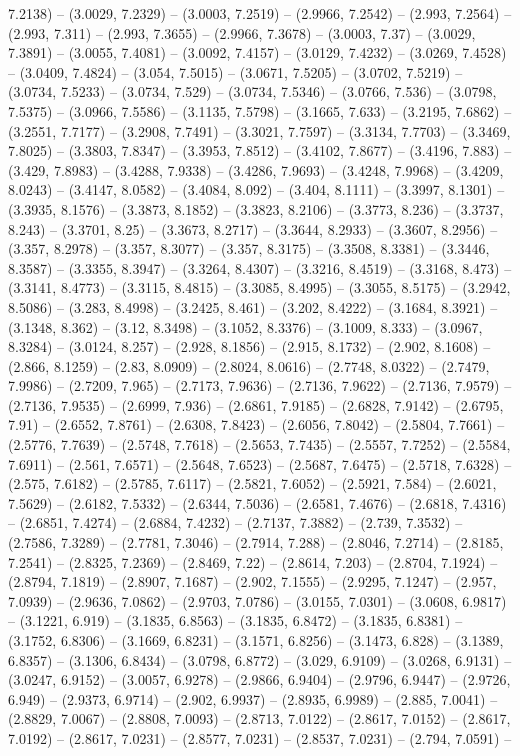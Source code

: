 7.2138) -- (3.0029, 7.2329) -- (3.0003, 7.2519) -- (2.9966, 7.2542) -- (2.993, 7.2564) -- (2.993, 7.311) -- (2.993, 7.3655) -- (2.9966, 7.3678) -- (3.0003, 7.37) -- (3.0029, 7.3891) -- (3.0055, 7.4081) -- (3.0092, 7.4157) -- (3.0129, 7.4232) -- (3.0269, 7.4528) -- (3.0409, 7.4824) -- (3.054, 7.5015) -- (3.0671, 7.5205) -- (3.0702, 7.5219) -- (3.0734, 7.5233) -- (3.0734, 7.529) -- (3.0734, 7.5346) -- (3.0766, 7.536) -- (3.0798, 7.5375) -- (3.0966, 7.5586) -- (3.1135, 7.5798) -- (3.1665, 7.633) -- (3.2195, 7.6862) -- (3.2551, 7.7177) -- (3.2908, 7.7491) -- (3.3021, 7.7597) -- (3.3134, 7.7703) -- (3.3469, 7.8025) -- (3.3803, 7.8347) -- (3.3953, 7.8512) -- (3.4102, 7.8677) -- (3.4196, 7.883) -- (3.429, 7.8983) -- (3.4288, 7.9338) -- (3.4286, 7.9693) -- (3.4248, 7.9968) -- (3.4209, 8.0243) -- (3.4147, 8.0582) -- (3.4084, 8.092) -- (3.404, 8.1111) -- (3.3997, 8.1301) -- (3.3935, 8.1576) -- (3.3873, 8.1852) -- (3.3823, 8.2106) -- (3.3773, 8.236) -- (3.3737, 8.243) -- (3.3701, 8.25) -- (3.3673, 8.2717) -- (3.3644, 8.2933) -- (3.3607, 8.2956) -- (3.357, 8.2978) -- (3.357, 8.3077) -- (3.357, 8.3175) -- (3.3508, 8.3381) -- (3.3446, 8.3587) -- (3.3355, 8.3947) -- (3.3264, 8.4307) -- (3.3216, 8.4519) -- (3.3168, 8.473) -- (3.3141, 8.4773) -- (3.3115, 8.4815) -- (3.3085, 8.4995) -- (3.3055, 8.5175) -- (3.2942, 8.5086) -- (3.283, 8.4998) -- (3.2425, 8.461) -- (3.202, 8.4222) -- (3.1684, 8.3921) -- (3.1348, 8.362) -- (3.12, 8.3498) -- (3.1052, 8.3376) -- (3.1009, 8.333) -- (3.0967, 8.3284) -- (3.0124, 8.257) -- (2.928, 8.1856) -- (2.915, 8.1732) -- (2.902, 8.1608) -- (2.866, 8.1259) -- (2.83, 8.0909) -- (2.8024, 8.0616) -- (2.7748, 8.0322) -- (2.7479, 7.9986) -- (2.7209, 7.965) -- (2.7173, 7.9636) -- (2.7136, 7.9622) -- (2.7136, 7.9579) -- (2.7136, 7.9535) -- (2.6999, 7.936) -- (2.6861, 7.9185) -- (2.6828, 7.9142) -- (2.6795, 7.91) -- (2.6552, 7.8761) -- (2.6308, 7.8423) -- (2.6056, 7.8042) -- (2.5804, 7.7661) -- (2.5776, 7.7639) -- (2.5748, 7.7618) -- (2.5653, 7.7435) -- (2.5557, 7.7252) -- (2.5584, 7.6911) -- (2.561, 7.6571) -- (2.5648, 7.6523) -- (2.5687, 7.6475) -- (2.5718, 7.6328) -- (2.575, 7.6182) -- (2.5785, 7.6117) -- (2.5821, 7.6052) -- (2.5921, 7.584) -- (2.6021, 7.5629) -- (2.6182, 7.5332) -- (2.6344, 7.5036) -- (2.6581, 7.4676) -- (2.6818, 7.4316) -- (2.6851, 7.4274) -- (2.6884, 7.4232) -- (2.7137, 7.3882) -- (2.739, 7.3532) -- (2.7586, 7.3289) -- (2.7781, 7.3046) -- (2.7914, 7.288) -- (2.8046, 7.2714) -- (2.8185, 7.2541) -- (2.8325, 7.2369) -- (2.8469, 7.22) -- (2.8614, 7.203) -- (2.8704, 7.1924) -- (2.8794, 7.1819) -- (2.8907, 7.1687) -- (2.902, 7.1555) -- (2.9295, 7.1247) -- (2.957, 7.0939) -- (2.9636, 7.0862) -- (2.9703, 7.0786) -- (3.0155, 7.0301) -- (3.0608, 6.9817) -- (3.1221, 6.919) -- (3.1835, 6.8563) -- (3.1835, 6.8472) -- (3.1835, 6.8381) -- (3.1752, 6.8306) -- (3.1669, 6.8231) -- (3.1571, 6.8256) -- (3.1473, 6.828) -- (3.1389, 6.8357) -- (3.1306, 6.8434) -- (3.0798, 6.8772) -- (3.029, 6.9109) -- (3.0268, 6.9131) -- (3.0247, 6.9152) -- (3.0057, 6.9278) -- (2.9866, 6.9404) -- (2.9796, 6.9447) -- (2.9726, 6.949) -- (2.9373, 6.9714) -- (2.902, 6.9937) -- (2.8935, 6.9989) -- (2.885, 7.0041) -- (2.8829, 7.0067) -- (2.8808, 7.0093) -- (2.8713, 7.0122) -- (2.8617, 7.0152) -- (2.8617, 7.0192) -- (2.8617, 7.0231) -- (2.8577, 7.0231) -- (2.8537, 7.0231) -- (2.794, 7.0591) -- 